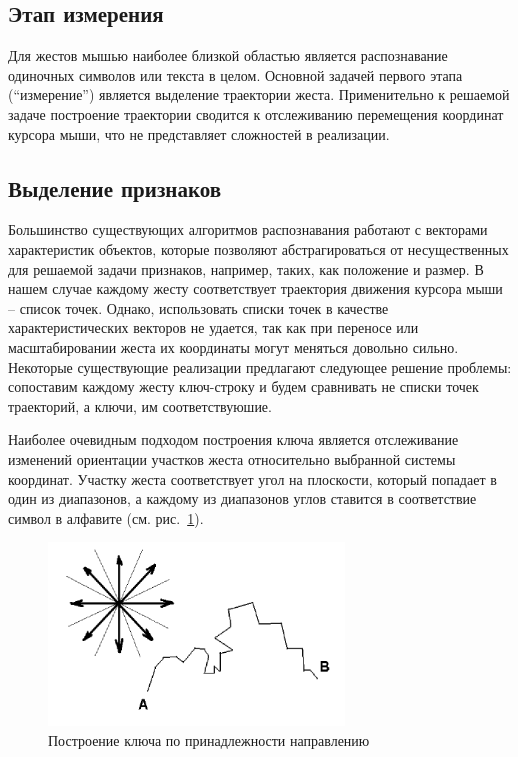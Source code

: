 \documentclass[a5paper]{article}
\begin{document}
\subsection{Этап измерения}
Для жестов мышью наиболее близкой областью является распознавание одиночных символов или текста в целом. Основной задачей первого этапа 
(``измерение'') является выделение траектории жеста. Применительно к решаемой задаче построение траектории сводится к отслеживанию 
перемещения координат курсора мыши, что не представляет сложностей в реализации. 

\subsection{Выделение признаков}

Большинство существующих алгоритмов распознавания работают с векторами характеристик объектов, которые позволяют абстрагироваться
от несущественных для решаемой задачи признаков, например, таких, как положение и размер. 
В нашем случае каждому жесту соответствует траектория движения курсора мыши -- список точек. Однако, использовать списки точек в качестве
характеристических векторов не удается, так как при переносе или масштабировании жеста их координаты могут меняться довольно сильно.
Некоторые существующие реализации предлагают следующее решение проблемы: сопоставим каждому жесту ключ-строку и будем сравнивать не 
списки точек траекторий, а ключи, им соответствуюшие.

Наиболее очевидным подходом построения ключа является отслеживание изменений ориентации участков жеста относительно выбранной системы координат. 
Участку жеста соответствует угол на плоскости, который попадает в один из диапазонов, а каждому из диапазонов 
углов ставится в соответствие символ в алфавите (см. рис.~\ref{chaos}). 

\begin{figure} [ht]
  \begin{center}
    \includegraphics[width=0.7\textwidth, bb=0 0 544 390]{02-chaos.png}
    \caption{Построение ключа по принадлежности направлению}
    \label{chaos}
  \end{center}
\end{figure}
\end{document}
